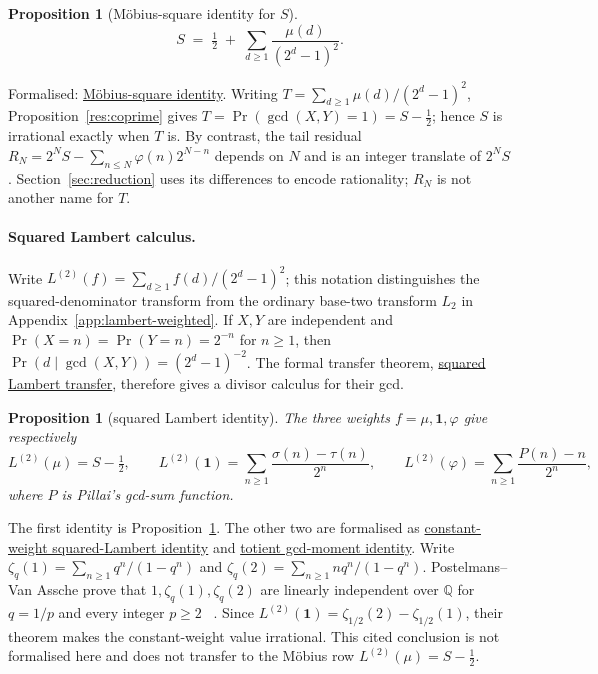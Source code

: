 \documentclass[11pt]{article}
\newcommand{\commit}{99f4bf47422abbd8757cbb22b50ba079d764d3a7}
\newcommand{\repobase}{https://github.com/wcook04/plectis-erdos/blob/\commit}
\newcommand{\PK}{Erdos249257}
\newcommand{\lword}[4]{\href{\repobase/\PK/#1\#L#2}{#4}}
\newtheorem{proposition}[theorem]{Proposition}
\theoremstyle{definition}
\theoremstyle{remark}
\newcommand{\Q}{\mathbb{Q}}
\newcommand{\ph}{\varphi}
\begin{document}
{\begin{proposition}[M\"obius-square identity for \(S\)]\label{res:lens}
\[
S \;=\; \tfrac12 \;+\; \sum_{d\ge1}\frac{\mu(d)}{(2^d-1)^2}.
\]
\end{proposition}
\noindent Formalised: \lword{CertificateKernel.lean}{18454}{totient_series_eq_half_add_moebius_mersenne_square}{M\"obius-square identity}.
Writing \(T=\sum_{d\ge1}\mu(d)/(2^d-1)^2\), Proposition~\ref{res:coprime}
gives \(T=\Pr(\gcd(X,Y)=1)=S-\tfrac12\); hence $S$ is irrational exactly
when $T$ is.  By contrast, the tail residual
\(R_N=2^NS-\sum_{n\le N}\ph(n)2^{N-n}\) depends on $N$ and is an integer
translate of $2^NS$.  Section~\ref{sec:reduction} uses its differences to
encode rationality; $R_N$ is not another name for $T$.

\paragraph{Squared Lambert calculus.}\label{sec:squared}
Write \(L^{(2)}(f)=\sum_{d\ge1}f(d)/(2^d-1)^2\); this notation distinguishes
the squared-denominator transform from the ordinary base-two transform $L_2$
in Appendix~\ref{app:lambert-weighted}.  If $X,Y$ are independent and
$\Pr(X=n)=\Pr(Y=n)=2^{-n}$ for $n\ge1$, then
$\Pr(d\mid\gcd(X,Y))=(2^d-1)^{-2}$.  The formal transfer theorem,
\lword{GcdMomentCalculus.lean}{105}{tsum_lambert_linear_weight_sq_pure}{squared Lambert transfer},
therefore gives a divisor calculus for their gcd.
\begin{proposition}[squared Lambert identity]\label{res:gcdmoment}
The three weights \(f=\mu,\mathbf 1,\ph\) give respectively
\[
 L^{(2)}(\mu)=S-\tfrac12,\qquad
 L^{(2)}(\mathbf 1)=\sum_{n\ge1}\frac{\sigma(n)-\tau(n)}{2^n},\qquad
 L^{(2)}(\ph)=\sum_{n\ge1}\frac{P(n)-n}{2^n},
\]
where \(P\) is Pillai's gcd-sum function.
\end{proposition}
\noindent The first identity is Proposition~\ref{res:lens}.  The other two are
formalised as \lword{GcdMomentCalculus.lean}{216}{tsum_one_div_mersenne_sq_eq_sigma_sub_tau_series}{constant-weight squared-Lambert identity} and
\lword{GcdMomentCalculus.lean}{235}{tsum_totient_div_mersenne_sq_eq_gcd_moment_series}{totient gcd-moment identity}.
Write
\(\zeta_q(1)=\sum_{n\ge1}q^n/(1-q^n)\) and
\(\zeta_q(2)=\sum_{n\ge1}nq^n/(1-q^n)\).
Postelmans--Van Assche prove that \(1,\zeta_q(1),\zeta_q(2)\) are linearly
independent over \(\Q\) for $q=1/p$ and every integer $p\ge2$
~\cite[Theorem~1.3 in the published version; Theorem~3 on p.~4 and proof in
Section~7, pp.~30--34, of the linked preprint]{postelmansvanassche}.  Since
$L^{(2)}(\mathbf1)=\zeta_{1/2}(2)-\zeta_{1/2}(1)$, their theorem makes the
constant-weight value irrational.  This cited conclusion is not formalised
here and does not transfer to the M\"obius row $L^{(2)}(\mu)=S-\tfrac12$.

}
\end{document}
